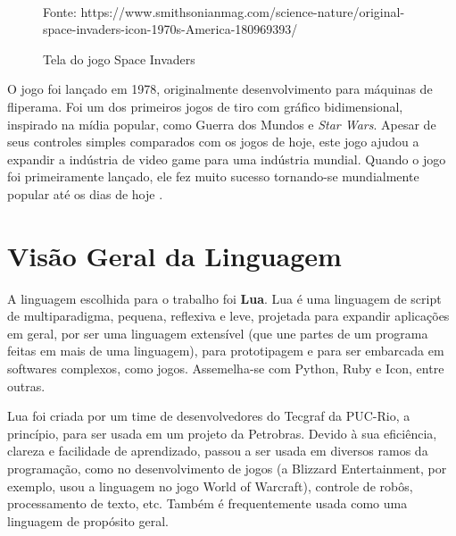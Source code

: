 \documentclass[rel_mlp]{iiufrgs}
\newcommand{\fonte}[1]{\\Fonte: {#1}}
\begin{document}
\begin{figure}[H]
     \centering
     \caption{Tela do jogo Space Invaders}
     \label{fig:Figura1}
     \fonte{https://www.smithsonianmag.com/science-nature/original-space-invaders-icon-1970s-America-180969393/}
 \end{figure}
 
O jogo foi lançado em 1978, originalmente desenvolvimento para máquinas de fliperama. Foi um dos primeiros jogos de tiro com gráfico bidimensional, inspirado na mídia popular, como Guerra dos Mundos e \textit{Star Wars}. Apesar de seus controles simples comparados com os jogos de hoje, este jogo ajudou a expandir a indústria de video game para uma indústria mundial. Quando o jogo foi primeiramente lançado, ele fez muito sucesso tornando-se mundialmente popular até os dias de hoje \cite{SpaceInvadersWikipedia}. 


\chapter{Visão Geral da Linguagem} \label{Linguagem}

A linguagem escolhida para o trabalho foi \textbf{Lua}. Lua é uma linguagem de script de multiparadigma, pequena, reflexiva e leve, projetada para expandir aplicações em geral, por ser uma linguagem extensível (que une partes de um programa feitas em mais de uma linguagem), para prototipagem e para ser embarcada em softwares complexos, como jogos. Assemelha-se com Python, Ruby e Icon, entre outras.

Lua foi criada por um time de desenvolvedores do Tecgraf da PUC-Rio, a princípio, para ser usada em um projeto da Petrobras. Devido à sua eficiência, clareza e facilidade de aprendizado, passou a ser usada em diversos ramos da programação, como no desenvolvimento de jogos (a Blizzard Entertainment, por exemplo, usou a linguagem no jogo World of Warcraft), controle de robôs, processamento de texto, etc. Também é frequentemente usada como uma linguagem de propósito geral.
\end{document}
